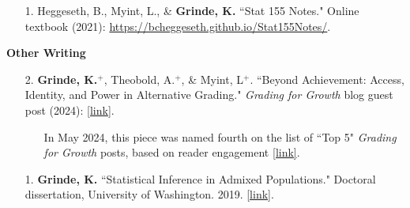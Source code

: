 \documentclass[margin]{res}
\begin{document}
\begin{resume}
\begin{itemize}
\item[1.] Heggeseth, B., Myint, L., \& \textbf{Grinde, K.} ``Stat 155 Notes." Online textbook (2021): \href{https://bcheggeseth.github.io/Stat155Notes/}{https://bcheggeseth.github.io/Stat155Notes/}. 

\end{itemize}


\textbf{Other Writing}
\begin{itemize}
\item[2.] \textbf{Grinde, K.}$^{+}$, Theobold,  A.$^{+}$, \& Myint,  L$^{+}$. ``Beyond Achievement: Access, Identity, and Power in Alternative Grading." \textit{Grading for Growth} blog guest post (2024): \href{https://gradingforgrowth.com/p/beyond-achievement?r=2ny4pq&utm_campaign=post&utm_medium=web}{[link]}.
	\begin{itemize} %
	\item[] \begin{footnotesize}
	In May 2024,  this piece was named fourth on the list of ``Top 5" \textit{Grading for Growth} posts, based on reader engagement \href{https://open.substack.com/pub/gradingforgrowth/p/the-top-5-sort-of-posts-at-grading?r=2ny4pq&utm_campaign=post&utm_medium=email}{[link]}.%
	\end{footnotesize}
	\end{itemize} %
\item[1.] \textbf{Grinde, K. }``Statistical Inference in Admixed Populations." Doctoral dissertation, University of Washington.  2019. \href{https://digital.lib.washington.edu/researchworks/handle/1773/44730?show=full}{[link]}.\\
\end{itemize}


\end{resume}
\end{document}
